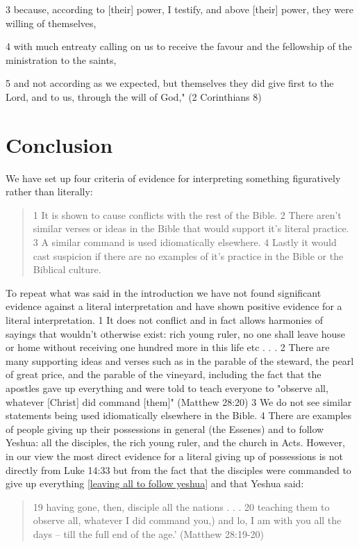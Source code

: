 \documentclass[11pt]{article}
\begin{document}
3 because, according to [their] power, I testify, and above [their] power, they were willing of themselves,

4 with much entreaty calling on us to receive the favour and the fellowship of the ministration to the saints,

5 and not according as we expected, but themselves they did give first to the Lord, and to us, through the will of God," (2 Corinthians 8)

\section{Conclusion}
We have set up four criteria of evidence for interpreting something figuratively rather than literally:
\begin{quote}
1 It is shown to cause conflicts with the rest of the Bible. 2 There aren't similar verses or ideas in the Bible that would support it's literal practice. 3 A similar command is used idiomatically elsewhere. 4 Lastly it would cast suspicion if there are no examples of it's practice in the Bible or the Biblical culture.
\end{quote}
To repeat what was said in the introduction we have not found significant evidence against a literal interpretation and have shown positive evidence for a literal interpretation. 1 It does not conflict and in fact allows harmonies of sayings that wouldn't otherwise exist: rich young ruler, no one shall leave house or home without receiving one hundred more in this life etc . . . 2 There are many supporting ideas and verses such as in the parable of the steward, the pearl of great price, and the parable of the vineyard, including the fact that the apostles gave up everything and were told to teach everyone to "observe all, whatever [Christ] did command [them]" (Matthew 28:20) 3 We do not see similar statements being used idiomatically elsewhere in the Bible. 4 There are examples of people giving up their possessions in general (the Essenes) and to follow Yeshua: all the disciples, the rich young ruler, and the church in Acts. 
However, in our view the most direct evidence for a literal giving up of possessions is not directly from Luke 14:33 but from the fact that the disciples were commanded to give up everything \ref{leaving all to follow yeshua} and that Yeshua said: 
\begin{quote}
19 having gone, then, disciple all the nations . . .
20 teaching them to observe all, whatever I did command you,) and lo, I am with you all the days -- till the full end of the age.' (Matthew 28:19-20)\end{quote}
\end{document}
